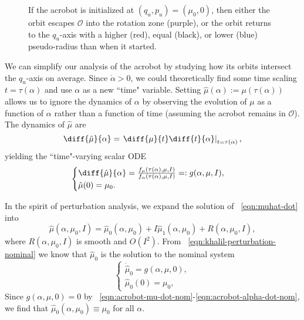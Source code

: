 \begin{figure}
    \centering 
    \caption{If the acrobot is initialized at \((q_u,p_u) = (\mu_0,0)\), then
        either the orbit escapes \(\mathcal{O}\) into the rotation
        zone (purple), or the orbit returns to the \(q_u\)-axis 
        with a higher (red), equal (black), or lower (blue) pseudo-radius than when it
        started.}
    \label{fig:acrobot-possible-orbits}
\end{figure}

We can simplify our analysis of the acrobot by studying how its orbits
intersect the \(q_u\)-axis on average.
Since \(\dot{\alpha} > 0\), we could theoretically find some time scaling 
\(t = \tau(\alpha)\) and use \(\alpha\) as a new ``time" variable.
Setting \(\hat{\mu}(\alpha) := \mu(\tau(\alpha))\) allows us to ignore the
dynamics of \(\alpha\) by observing the evolution of \(\mu\) as a function of
\(\alpha\) rather than a function of time (assuming the acrobot remains in
\(\mathcal{O}\)).
The dynamics of \(\hat{\mu}\) are
\[
    \diff{\hat{\mu}}{\alpha} = 
    \left.\diff{\mu}{t} \diff{t}{\alpha} \right|_{t =\tau(\alpha)}
    ,
\] 
yielding the ``time"-varying scalar ODE
\begin{equation}\label{eqn:muhat-dot}
    \begin{cases}
        \diff{\hat{\mu}}{\alpha} 
        = \frac{f_\mu(\tau(\alpha),\mu,I)}{f_\alpha(\tau(\alpha),\mu,I)}
        =: g(\alpha,\mu,I)
        , \\
        \hat{\mu}(0) = \mu_0
        .
    \end{cases}
\end{equation}

In the spirit of perturbation analysis, we expand the solution of
~\eqref{eqn:muhat-dot} into
\begin{equation}\label{eqn:acrobot-muhat-approx}
    \hat{\mu}(\alpha,\mu_0,I) = \hat{\mu}_0(\alpha,\mu_0) + I
    \hat{\mu}_1(\alpha,\mu_0)
    + R(\alpha,\mu_0,I)
    ,
\end{equation}
where \(R(\alpha,\mu_0,I)\) is smooth and \(O(I^2)\).
From ~\eqref{eqn:khalil-perturbation-nominal} we know that 
\(\hat{\mu}_0\) is the solution to the nominal system
\[
\begin{cases}
    \dot{\hat{\mu}}_0 = g(\alpha,\mu,0)
    , \\
    \hat{\mu}_0(0) = \mu_0
    ,
\end{cases}
\]
Since \(g(\alpha,\mu,0) = 0\) by 
~\eqref{eqn:acrobot-mu-dot-nom}-\eqref{eqn:acrobot-alpha-dot-nom}, we find that
\(\hat{\mu}_0(\alpha,\mu_0) \equiv \mu_0\) for all \(\alpha\).

